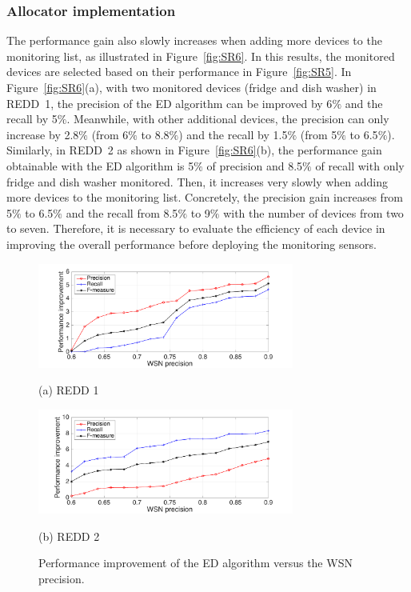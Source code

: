 \subsubsection{Allocator implementation}
The performance gain also slowly increases when adding more devices to the monitoring list, as illustrated in Figure~\ref{fig:SR6}. In this results, the monitored devices are selected based on their performance in Figure~\ref{fig:SR5}. In Figure~\ref{fig:SR6}(a), with two monitored devices (fridge and dish washer) in REDD~1, the precision of the ED algorithm can be improved by 6$\%$ and the recall by 5$\%$. Meanwhile, with other additional devices, the precision can only increase by 2.8$\%$ (from 6$\%$ to 8.8$\%$) and the recall by 1.5$\%$ (from 5$\%$ to 6.5$\%$). Similarly, in REDD~2 as shown in Figure~\ref{fig:SR6}(b), the performance gain obtainable with the ED algorithm is 5$\%$ of precision and 8.5$\%$ of recall with only fridge and dish washer monitored. Then, it increases very slowly when adding more devices to the monitoring list. Concretely, the precision gain increases from 5$\%$ to 6.5$\%$ and the recall from 8.5$\%$ to 9$\%$ with the number of devices from two to seven. Therefore, it is necessary to evaluate the efficiency of each device in improving the overall performance before deploying the monitoring sensors.

\begin{figure}[htb]
\begin{minipage}[b]{1\linewidth}
  \centering
  \centerline{\includegraphics[width=0.75\textwidth]{./chapters/chapter5/images/R1_ed_pr.pdf}}
  \centerline{(a) REDD 1}\medskip
\end{minipage}
\hfill
\begin{minipage}[b]{1\linewidth}
  \centering
  \centerline{\includegraphics[width=0.75\textwidth]{./chapters/chapter5/images/R2_ed_pr.pdf}}
  \centerline{(b) REDD 2}\medskip
\end{minipage}
\caption{Performance improvement of the ED algorithm versus the WSN precision.}
\label{fig:SR7}
%
\end{figure}

